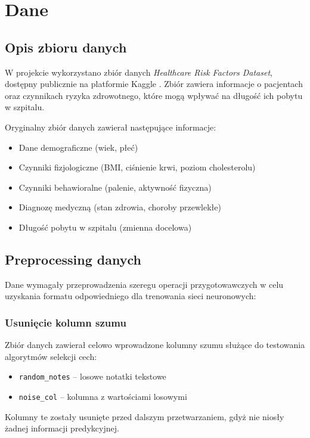 \section{Dane}

\subsection{Opis zbioru danych}

W projekcie wykorzystano zbiór danych \textit{Healthcare Risk Factors Dataset}, dostępny publicznie na platformie Kaggle \cite{healthcare_dataset}. Zbiór zawiera informacje o pacjentach oraz czynnikach ryzyka zdrowotnego, które mogą wpływać na długość ich pobytu w szpitalu.

Oryginalny zbiór danych zawierał następujące informacje:
\begin{itemize}
    \item Dane demograficzne (wiek, płeć)
    \item Czynniki fizjologiczne (BMI, ciśnienie krwi, poziom cholesterolu)
    \item Czynniki behawioralne (palenie, aktywność fizyczna)
    \item Diagnozę medyczną (stan zdrowia, choroby przewlekłe)
    \item Długość pobytu w szpitalu (zmienna docelowa)
\end{itemize}

\subsection{Preprocessing danych}

Dane wymagały przeprowadzenia szeregu operacji przygotowawczych w celu uzyskania formatu odpowiedniego dla trenowania sieci neuronowych:

\subsubsection{Usunięcie kolumn szumu}

Zbiór danych zawierał celowo wprowadzone kolumny szumu służące do testowania algorytmów selekcji cech:
\begin{itemize}
    \item \texttt{random\_notes} -- losowe notatki tekstowe
    \item \texttt{noise\_col} -- kolumna z wartościami losowymi
\end{itemize}

Kolumny te zostały usunięte przed dalszym przetwarzaniem, gdyż nie niosły żadnej informacji predykcyjnej.

